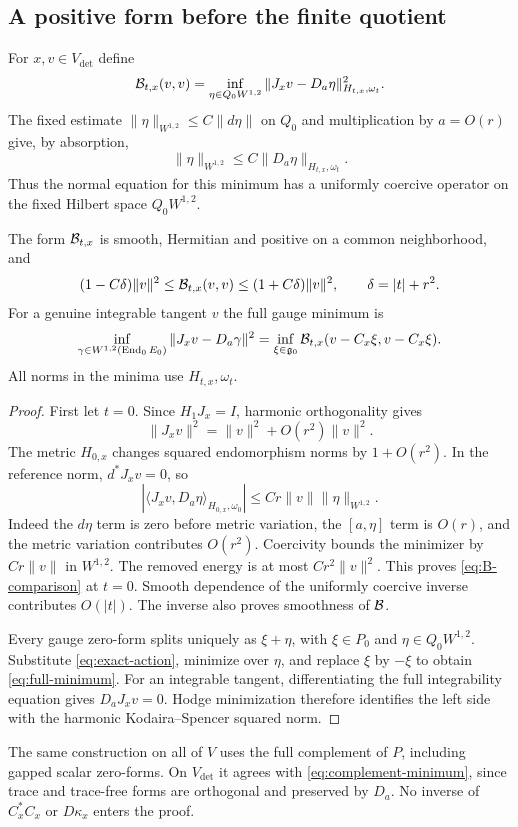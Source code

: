 \subsection{A positive form before the finite quotient}

For $x,v\in V_{\det}$ define
\begin{equation}\label{eq:complement-minimum}
 \mathcal B_{t,x}(v,v)=\inf_{\eta\in Q_0W^{1,2}}
       \|J_xv-D_a\eta\|^2_{H_{t,x},\omega_t}.
\end{equation}
The fixed estimate $\|\eta\|_{W^{1,2}}\le C\|d\eta\|$ on $Q_0$
and multiplication by $a=O(r)$ give, by absorption,
\begin{equation}\label{eq:complement-coercive}
 \|\eta\|_{W^{1,2}}\le C\|D_a\eta\|_{H_{t,x},\omega_t}.
\end{equation}
Thus the normal equation for this minimum has a uniformly coercive
operator on the fixed Hilbert space $Q_0W^{1,2}$.

\begin{proposition}\label{prop:positive-form}
The form $\mathcal B_{t,x}$ is smooth, Hermitian and positive on a common
neighborhood, and
\begin{equation}\label{eq:B-comparison}
 (1-C\delta)\|v\|^2\le\mathcal B_{t,x}(v,v)\le(1+C\delta)\|v\|^2,
 \qquad \delta=|t|+r^2.
\end{equation}
For a genuine integrable tangent $v$ the full gauge minimum is
\begin{equation}\label{eq:full-minimum}
 \inf_{\gamma\in W^{1,2}(\operatorname{End}_0E_0)}
       \|J_xv-D_a\gamma\|^2
 =\inf_{\xi\in\mathfrak g_0}\mathcal B_{t,x}(v-C_x\xi,v-C_x\xi).
\end{equation}
All norms in the minima use $H_{t,x},\omega_t$.
\end{proposition}

\begin{proof}
First let $t=0$. Since $H_1J_x=I$, harmonic orthogonality gives
\[
 \|J_xv\|^2=\|v\|^2+O(r^2)\|v\|^2 .
\]
The metric $H_{0,x}$ changes squared endomorphism norms by
$1+O(r^2)$. In the reference norm, $d^*J_xv=0$, so
\[
 |\langle J_xv,D_a\eta\rangle_{H_{0,x},\omega_0}|
             \le Cr\|v\|\|\eta\|_{W^{1,2}}.
\]
Indeed the $d\eta$ term is zero before metric variation, the
$[a,\eta]$ term is $O(r)$, and the metric variation contributes
$O(r^2)$. Coercivity bounds the minimizer by $Cr\|v\|$ in
$W^{1,2}$. The removed energy is at most $Cr^2\|v\|^2$.
This proves \eqref{eq:B-comparison} at $t=0$. Smooth dependence
of the uniformly coercive inverse contributes $O(|t|)$.
The inverse also proves smoothness of $\mathcal B$.

Every gauge zero-form splits uniquely as $\xi+\eta$, with
$\xi\in P_0$ and $\eta\in Q_0W^{1,2}$. Substitute
\eqref{eq:exact-action}, minimize over $\eta$, and replace $\xi$ by
$-\xi$ to obtain \eqref{eq:full-minimum}.
For an integrable tangent, differentiating the full integrability
equation gives $D_aJ_xv=0$. Hodge minimization therefore identifies
the left side with the harmonic Kodaira--Spencer squared norm.
\end{proof}

The same construction on all of $V$ uses the full complement of $P$,
including gapped scalar zero-forms. On $V_{\det}$ it agrees with
\eqref{eq:complement-minimum}, since trace and trace-free forms are
orthogonal and preserved by $D_a$. No inverse of $C_x^*C_x$ or
$D\kappa_x$ enters the proof.

